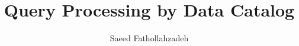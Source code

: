 \title[Query Processing by Data Catalog]{Query Processing by Data Catalog}

\author{Saeed Fathollahzadeh} 

\renewcommand{\shortauthors}{Saeed Fathollahzadeh}

\maketitle